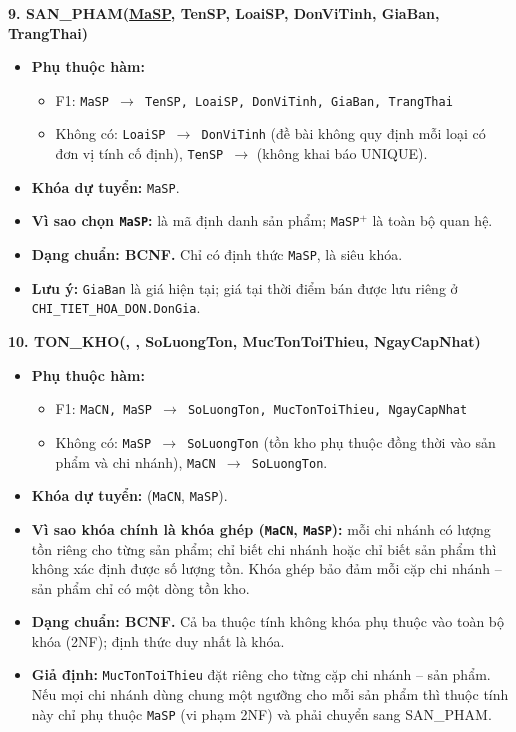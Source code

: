 \documentclass[11pt, a4paper]{article}
\newcommand{\pk}[1]{\bgroup\ULdepth=1.8pt\uline{#1}\egroup}
\newcommand{\pkfk}[1]{\bgroup\ULdepth=1.8pt\uline{\bgroup\ULdepth=4.0pt\dashuline{#1}\egroup}\egroup}
\begin{document}
\textbf{9. SAN\_PHAM(\pk{MaSP}, TenSP, LoaiSP, DonViTinh, GiaBan, TrangThai)}
\begin{itemize}
    \item \textbf{Phụ thuộc hàm:}
    \begin{itemize}
        \item F1: \texttt{MaSP $\rightarrow$ TenSP, LoaiSP, DonViTinh, GiaBan, TrangThai}
        \item Không có: \texttt{LoaiSP $\rightarrow$ DonViTinh} (đề bài không quy định mỗi loại có đơn vị tính cố định), \texttt{TenSP $\rightarrow$} (không khai báo UNIQUE).
    \end{itemize}
    \item \textbf{Khóa dự tuyển:} \texttt{MaSP}.
    \item \textbf{Vì sao chọn \texttt{MaSP}:} là mã định danh sản phẩm; \texttt{MaSP$^+$} là toàn bộ quan hệ.
    \item \textbf{Dạng chuẩn: BCNF.} Chỉ có định thức \texttt{MaSP}, là siêu khóa.
    \item \textbf{Lưu ý:} \texttt{GiaBan} là giá hiện tại; giá tại thời điểm bán được lưu riêng ở \texttt{CHI\_TIET\_HOA\_DON.DonGia}.
\end{itemize}

\textbf{10. TON\_KHO(\pkfk{MaCN}, \pkfk{MaSP}, SoLuongTon, MucTonToiThieu, NgayCapNhat)}
\begin{itemize}
    \item \textbf{Phụ thuộc hàm:}
    \begin{itemize}
        \item F1: \texttt{MaCN, MaSP $\rightarrow$ SoLuongTon, MucTonToiThieu, NgayCapNhat}
        \item Không có: \texttt{MaSP $\rightarrow$ SoLuongTon} (tồn kho phụ thuộc đồng thời vào sản phẩm và chi nhánh), \texttt{MaCN $\rightarrow$ SoLuongTon}.
    \end{itemize}
    \item \textbf{Khóa dự tuyển:} (\texttt{MaCN}, \texttt{MaSP}).
    \item \textbf{Vì sao khóa chính là khóa ghép (\texttt{MaCN}, \texttt{MaSP}):} mỗi chi nhánh có lượng tồn riêng cho từng sản phẩm; chỉ biết chi nhánh hoặc chỉ biết sản phẩm thì không xác định được số lượng tồn. Khóa ghép bảo đảm mỗi cặp chi nhánh -- sản phẩm chỉ có một dòng tồn kho.
    \item \textbf{Dạng chuẩn: BCNF.} Cả ba thuộc tính không khóa phụ thuộc vào toàn bộ khóa (2NF); định thức duy nhất là khóa.
    \item \textbf{Giả định:} \texttt{MucTonToiThieu} đặt riêng cho từng cặp chi nhánh -- sản phẩm. Nếu mọi chi nhánh dùng chung một ngưỡng cho mỗi sản phẩm thì thuộc tính này chỉ phụ thuộc \texttt{MaSP} (vi phạm 2NF) và phải chuyển sang SAN\_PHAM.
\end{itemize}
\end{document}
